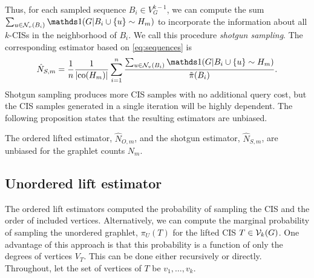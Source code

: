 	Thus, for each sampled sequence $B_i \in V_G^{k-1}$, we can compute the sum $\sum_{u\in \cN_v(B_i)} \ind(G|B_i \cup \{u\} \sim H_m)$ to incorporate the information about all $k$-CISs in the neighborhood of $B_i$.
	We call this procedure {\em shotgun sampling}.
	The corresponding estimator based on \eqref{eq:sequences} is
	\begin{equation}
	\label{eq:shot_est}
	    \hat N_{S,m} = \frac{1}{n}\frac{1}{|\co(H_m)|} \sum_{i=1}^n \frac{\sum_{u \in \cN_v(B_i)} \ind(G|B_i \cup \{u\} \sim H_m)}{\tilde \pi(B_i)}.
	\end{equation}
	Shotgun sampling produces more CIS samples with no additional query cost, but the CIS samples generated in a single iteration will be highly dependent.
	The following proposition states that the resulting estimators are unbiased.
	
	\begin{proposition}
	\label{prop:unbiased}
    The ordered lifted estimator, $\hat N_{O,m}$, and the shotgun estimator, $\hat N_{S,m}$, are unbiased for the graphlet counts $N_m$.
    \end{proposition}
	
	
	\subsection{Unordered lift estimator}
	
	The ordered lift estimators computed the probability of sampling the CIS and the order of included vertices.
	Alternatively, we can compute the marginal probability of sampling the unordered graphlet, $\pi_U(T)$ for the lifted CIS $T \in \mathcal{V}_k(G)$.
    One advantage of this approach is that this probability is a function of only the degrees of vertices $V_T$.
	This can be done either recursively or directly. 
	Throughout, let the set of vertices of $T$ be $v_1,\ldots,v_k$.
	
